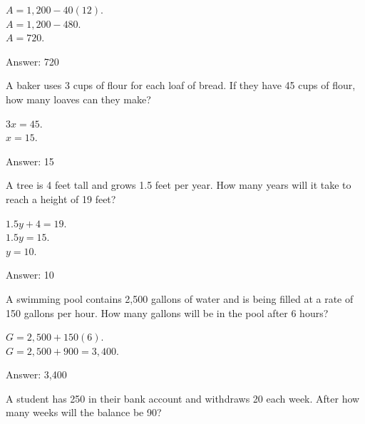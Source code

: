 \documentclass[11pt,paper=a4,answers]{exam}
\begin{document}
\begin{questions}
\begin{solution}
$A = 1,200 - 40(12)$. 
\\[10pt]
$A = 1,200 - 480$. 
\\[10pt]
$A = 720$.

\vspace{20pt}
Answer: \colorbox{yellow!100}{720}
\end{solution}

\question
A baker uses 3 cups of flour for each loaf of bread. If they have 45 cups of flour, how many loaves can they make?

\begin{solution}
$3x = 45$. 
\\[10pt]
$x = 15$.

\vspace{20pt}
Answer: \colorbox{yellow!100}{15}
\end{solution}

\question
A tree is 4 feet tall and grows 1.5 feet per year. How many years will it take to reach a height of 19 feet?

\begin{solution}
$1.5y + 4 = 19$. 
\\[10pt]
$1.5y = 15$. 
\\[10pt]
$y = 10$.

\vspace{20pt}
Answer: \colorbox{yellow!100}{10}
\end{solution}

\question
A swimming pool contains 2,500 gallons of water and is being filled at a rate of 150 gallons per hour. How many gallons will be in the pool after 6 hours?

\begin{solution}
$G = 2,500 + 150(6)$. 
\\[10pt]
$G = 2,500 + 900 = 3,400$.

\vspace{20pt}
Answer: \colorbox{yellow!100}{3,400}
\end{solution}

\question
A student has 250 in their bank account and withdraws 20 each week. After how many weeks will the balance be 90?


\end{questions}
\end{document}
